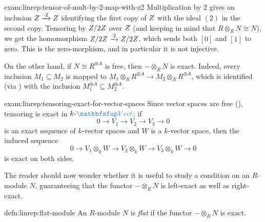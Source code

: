 \begin{exam}{}{exam:linrep:tensor-of-mult-by-2-map-with-z2}
  Multiplication by $2$ gives an inclusion
  $Z \xrightarrow{\cdot 2} Z$ identifying the first copy of $Z$
  with the ideal $(2)$ in the second copy. Tensoring by $Z/2Z$ over
  $Z$ (and keeping in mind that $R \otimes_R N \cong N$), we get the
  homomorphism $Z/2Z \xrightarrow{\cdot 2} Z/2Z$, which sends both
  $[0]$ and $[1]$ to zero. This is the zero-morphism, and in
  particular it is not injective.
\end{exam}
On the other hand, if $N \cong R^{\oplus A}$ is free, then
$\mathord{-} \otimes_R N$ is exact. Indeed, every inclusion
$M_1 \subseteq M_2$ is mapped to
$M_1 \otimes_R R^{\oplus A} \to M_2 \otimes_R R^{\oplus A}$, which is
identified (via )
with the inclusion $M_1^{\oplus A} \subseteq M_2^{\oplus A}$.

\begin{exam}{}{exam:linrep:tensoring-exact-for-vector-spaces}
  Since vector spaces are free
  (),
  tensoring is exact
  in $k\text{-}\categ{Vect}$: if
  \[
    0 \to V_1 \to V_2 \to V_3 \to 0
  \]
  is an exact sequence of $k$-vector spaces and $W$ is a $k$-vector
  space, then the induced sequence
  \[
    0 \to V_1 \otimes_k W \to V_2 \otimes_k W \to V_3 \otimes_k W \to
    0
  \]
  is exact on both sides.
\end{exam}
The reader should now wonder whether it is useful to study a condition
on an $R$-module $N$, guaranteeing that the functor
$\mathord{-} \otimes_R N$ is left-exact as well as right-exact.

\begin{defn}{}{defn:linrep:flat-module}
  An $R$-module $N$ is \emph{flat} if the functor
  $\mathord{-} \otimes_R N$ is exact.
\end{defn}

